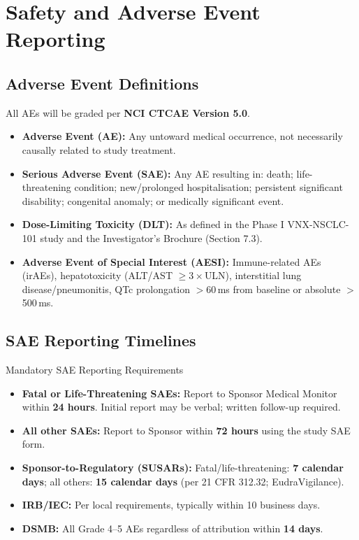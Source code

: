 \section{Safety and Adverse Event Reporting}
\label{sec:safety}

\subsection{Adverse Event Definitions}

All AEs will be graded per \textbf{NCI CTCAE Version 5.0}.

\begin{itemize}
  \item \textbf{Adverse Event (AE):} Any untoward medical occurrence, not necessarily causally related to study treatment.
  \item \textbf{Serious Adverse Event (SAE):} Any AE resulting in: death; life-threatening condition; new/prolonged hospitalisation; persistent significant disability; congenital anomaly; or medically significant event.
  \item \textbf{Dose-Limiting Toxicity (DLT):} As defined in the Phase I VNX-NSCLC-101 study and the Investigator's Brochure (Section 7.3).
  \item \textbf{Adverse Event of Special Interest (AESI):} Immune-related AEs (irAEs), hepatotoxicity (ALT/AST $\geq 3\times$ULN), interstitial lung disease/pneumonitis, QTc prolongation $>$60\,ms from baseline or absolute $>$500\,ms.
\end{itemize}

\subsection{SAE Reporting Timelines}

\begin{safetynote}{\faExclamationTriangle\quad Mandatory SAE Reporting Requirements}
  \begin{itemize}[leftmargin=1.2em]
    \item \textbf{Fatal or Life-Threatening SAEs:} Report to Sponsor Medical Monitor within \textbf{24 hours}. Initial report may be verbal; written follow-up required.
    \item \textbf{All other SAEs:} Report to Sponsor within \textbf{72 hours} using the study SAE form.
    \item \textbf{Sponsor-to-Regulatory (SUSARs):} Fatal/life-threatening: \textbf{7 calendar days}; all others: \textbf{15 calendar days} (per 21 CFR 312.32; EudraVigilance).
    \item \textbf{IRB/IEC:} Per local requirements, typically within 10 business days.
    \item \textbf{DSMB:} All Grade 4--5 AEs regardless of attribution within \textbf{14 days}.
  \end{itemize}
\end{safetynote}

